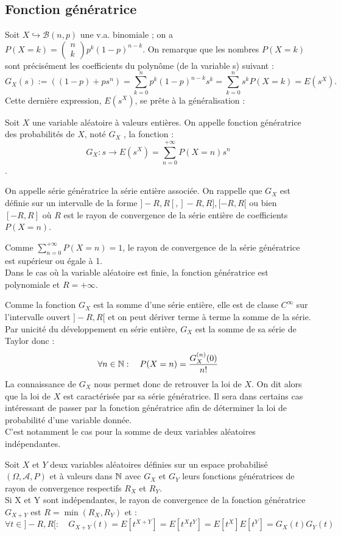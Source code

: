 \documentclass{book}
\begin{document}
\subsection{Fonction génératrice}
Soit $X \hookrightarrow \mathcal{B}(n, p)$ une v.a. binomiale ; on a $P(X = k) =\begin{pmatrix}n\\k\end{pmatrix}p^k(1-p)^{n-k}$. On remarque que
les nombres $P(X = k)$ sont précisément les coefficients du polynôme (de la variable s) suivant :
$$G_X (s) := ((1 - p) + ps^n )=\sum_{k=0}^n p^k(1 - p)^{n-k} s^k = \sum_{k=0}^n s^k P(X = k) = E(s^X).$$
Cette dernière expression, $E(s^X)$, se prête à la généralisation :
\begin{Definition}
Soit $X$ une variable aléatoire à valeurs entières. On appelle fonction génératrice des probabilités de $X$, 
noté $G_X$ , la fonction :
$$ G_X: s \to E(s^X ) = \sum_{n=0}^{+\infty} P(X = n) s^n$$.

On appelle série génératrice la série entière associée. On rappelle que $G_X$ est définie sur un intervalle de
la forme $] - R,R[, ] - R,R], [-R,R[$ ou bien $[-R,R]$ où $R$ est le rayon de convergence de la série entière de
coefficients $P(X = n)$.
\end{Definition}
\begin{Remarque}
Comme $\sum_{n=0}^{+\infty} P(X = n) =1$, le rayon de convergence de la série génératrice est supérieur ou égale à 1.\\
Dans le cas où la variable aléatoire est finie, la fonction génératrice est polynomiale et $R = +\infty$.
\end{Remarque}
Comme la fonction $G_X$ est la somme d'une série entière, elle est de classe $C^{\infty}$ sur l'intervalle ouvert $]-R,R[$ et on peut dériver terme à terme la somme de la série. Par unicité du développement en série entière, $G_X$ est la somme de sa
série de Taylor donc : 
$$ \forall n \in  \mathbb{N}: \quad  P(X = n) = \frac{G_X^{(n)}(0)}{n!}$$
La connaissance de $G_X$ nous permet donc de retrouver la loi de $X$. On dit alors que la loi de $X$ est caractérisée par sa série génératrice. Il sera dans certains
cas intéressant de passer par la fonction génératrice
afin de déterminer la loi de probabilité d'une variable
donnée.\\
C'est notamment le cas pour la somme de deux variables aléatoires indépendantes.
\begin{Theoreme}
Soit $X$ et $Y$ deux variables aléatoires définies sur un espace probabilisé $(\Omega ,\mathcal{A} ,P)$ et à valeurs dans $\mathbb{N}$ avec $G_X$ et $G_Y$ leurs fonctions génératrices de rayon de convergence respectifs $R_X$ et $R_Y$.\\
Si X et Y sont indépendantes, le rayon de convergence de la  fonction génératrice $G_{X +Y}$ est $R=\min(R_X ,R_Y )$ et :
$$\forall t\in]-R,R[:\quad G_{X +Y} (t ) = E[t^{X +Y}]=  E[t^{X}t^{Y}]=E[t^{X}]E[t^{Y}]= G_X (t )G_Y (t )$$
\end{Theoreme}
\end{document}
